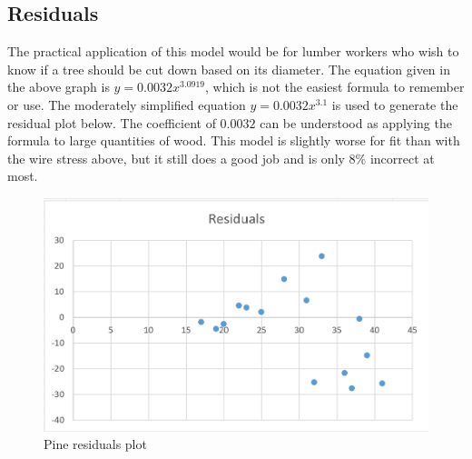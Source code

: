 \documentclass[12pt]{extarticle}
\begin{document}
\subsection{Residuals}
The practical application of this model would be for lumber workers who wish to know if a tree should be cut down based on its diameter. The equation given in the above graph is $y = 0.0032x^{3.0919}$, which is not the easiest formula to remember or use. The moderately simplified equation $y = 0.0032x^{3.1}$ is used to generate the residual plot below. The coefficient of $0.0032$ can be understood as applying the formula to large quantities of wood. This model is slightly worse for fit than with the wire stress above, but it still does a good job and is only 8\% incorrect at most. 
\begin{figure}[ht!]
  \includegraphics[width=\linewidth]{PineResiduals.PNG}
  \caption{Pine residuals plot}
\end{figure}
\end{document}
